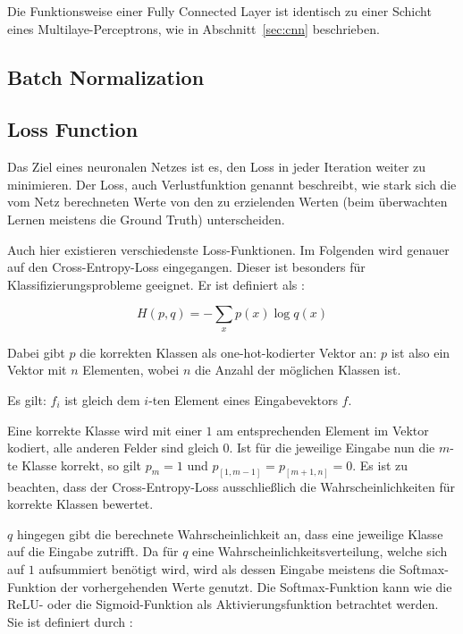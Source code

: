 Die Funktionsweise einer Fully Connected Layer ist identisch zu einer Schicht eines Multilaye-Perceptrons, wie in Abschnitt~\ref{sec:cnn} beschrieben.

\subsection{Batch Normalization}
\label{ssec:bn}

\subsection{Loss Function}
\label{ssec:loss}

Das Ziel eines neuronalen Netzes ist es, den Loss in jeder Iteration weiter zu minimieren. Der Loss, auch Verlustfunktion genannt beschreibt, wie stark sich die vom Netz berechneten Werte von den zu erzielenden Werten (beim überwachten Lernen meistens die Ground Truth) unterscheiden.

Auch hier existieren verschiedenste Loss-Funktionen. Im Folgenden wird genauer auf den Cross-Entropy-Loss eingegangen. Dieser ist besonders für Klassifizierungsprobleme geeignet. Er ist definiert als \cite{cs231n}:

\begin{equation}
H(p,q) = -\sum_x p(x)\log q(x)
\end{equation}

Dabei gibt $p$ die korrekten Klassen als one-hot-kodierter Vektor an: $p$ ist also ein Vektor mit $n$ Elementen, wobei $n$ die Anzahl der möglichen Klassen ist. 

Es gilt: $f_i$ ist gleich dem $i$-ten Element eines Eingabevektors $f$.

Eine korrekte Klasse wird mit einer $1$ am entsprechenden Element im Vektor kodiert, alle anderen Felder sind gleich $0$. Ist für die jeweilige Eingabe nun \bspw die $m$-te Klasse korrekt, so gilt $p_m=1$ und $p_{\left[1,m-1\right]} = p_{\left[m+1,n\right]} = 0$. Es ist zu beachten, dass der Cross-Entropy-Loss ausschließlich die Wahrscheinlichkeiten für korrekte Klassen bewertet.

$q$ hingegen gibt die berechnete Wahrscheinlichkeit an, dass eine jeweilige Klasse auf die Eingabe zutrifft. Da für $q$ eine Wahrscheinlichkeitsverteilung, welche sich auf $1$ aufsummiert benötigt wird, wird als dessen Eingabe meistens die Softmax-Funktion der vorhergehenden Werte genutzt. Die Softmax-Funktion kann wie die ReLU- oder die Sigmoid-Funktion als Aktivierungsfunktion betrachtet werden. Sie ist definiert durch \cite{cs231n}:


